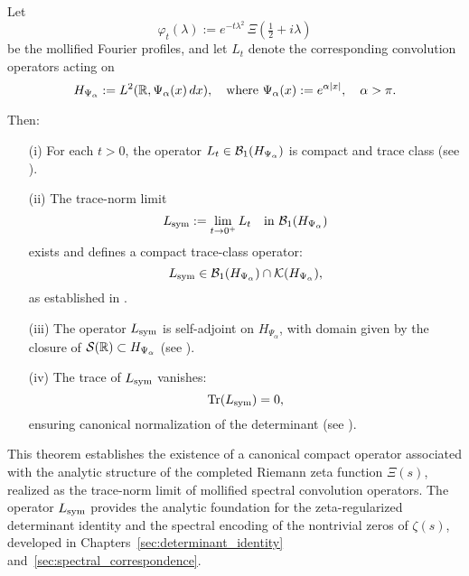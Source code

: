 \begin{theorem}
\label{thm:existence_Lsym}
Let
\[
\varphi_t(\lambda) := e^{-t\lambda^2} \, \Xi\left( \tfrac{1}{2} + i\lambda \right)
\]
be the mollified Fourier profiles, and let \( L_t \) denote the corresponding convolution operators acting on
\[
H_{\Psi_\alpha} := L^2(\mathbb{R}, \Psi_\alpha(x)\, dx),
\quad \text{where } \Psi_\alpha(x) := e^{\alpha |x|}, \quad \alpha > \pi.
\]

Then:
\begin{enumerate}
  \item[\textnormal{(i)}] For each \( t > 0 \), the operator \( L_t \in \mathcal{B}_1(H_{\Psi_\alpha}) \) is compact and trace class (see ).

  \item[\textnormal{(ii)}] The trace-norm limit
  \[
  L_{\mathrm{sym}} := \lim_{t \to 0^+} L_t \quad \text{in } \mathcal{B}_1(H_{\Psi_\alpha})
  \]
  exists and defines a compact trace-class operator:
  \[
  L_{\mathrm{sym}} \in \mathcal{B}_1(H_{\Psi_\alpha}) \cap \mathcal{K}(H_{\Psi_\alpha}),
  \]
  as established in .

  \item[\textnormal{(iii)}] The operator \( L_{\mathrm{sym}} \) is self-adjoint on \( H_{\Psi_\alpha} \), with domain given by the closure of \( \mathcal{S}(\mathbb{R}) \subset H_{\Psi_\alpha} \) (see ).

  \item[\textnormal{(iv)}] The trace of \( L_{\mathrm{sym}} \) vanishes:
  \[
  \operatorname{Tr}(L_{\mathrm{sym}}) = 0,
  \]
  ensuring canonical normalization of the determinant (see ).
\end{enumerate}

\medskip
\noindent
This theorem establishes the existence of a canonical compact operator associated with the analytic structure of the completed Riemann zeta function \( \Xi(s) \), realized as the trace-norm limit of mollified spectral convolution operators. The operator \( L_{\mathrm{sym}} \) provides the analytic foundation for the zeta-regularized determinant identity and the spectral encoding of the nontrivial zeros of \( \zeta(s) \), developed in Chapters~\ref{sec:determinant_identity} and~\ref{sec:spectral_correspondence}.
\end{theorem}
